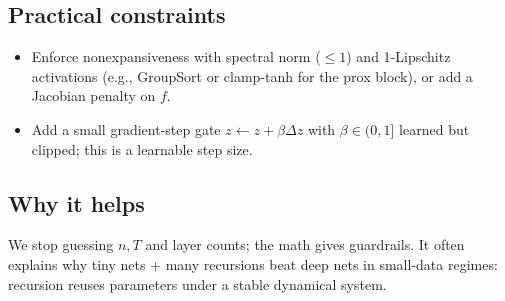 \documentclass[11pt,article]{article}
\begin{document}
\subsection{Practical constraints}

\begin{itemize}
    \item Enforce nonexpansiveness with spectral norm ($\le 1$) and 1-Lipschitz activations (e.g., GroupSort or clamp-tanh for the prox block), or add a Jacobian penalty on $f$.
    \item Add a small gradient-step gate $z \leftarrow z + \beta \Delta z$ with $\beta\in(0,1]$ learned but clipped; this is a learnable step size.
\end{itemize}

\subsection{Why it helps}

We stop guessing $n,T$ and layer counts; the math gives guardrails. It often explains why tiny nets + many recursions beat deep nets in small-data regimes: recursion reuses parameters under a stable dynamical system.
\end{document}

